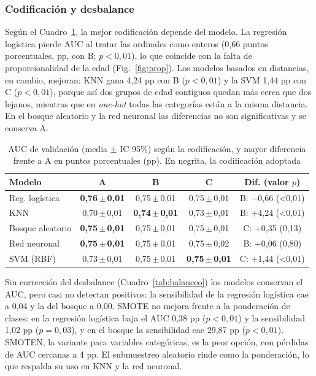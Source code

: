 \subsubsection{Codificación y desbalance}
Según el Cuadro~\ref{tab:codificacion}, la mejor codificación depende del modelo. La regresión logística pierde AUC al tratar las ordinales como enteros (0,66 puntos porcentuales, pp, con B; $p<0{,}01$), lo que coincide con la falta de proporcionalidad de la edad (Fig.~\ref{fig:prop}). Los modelos basados en distancias, en cambio, mejoran: KNN gana 4,24 pp con B ($p<0{,}01$) y la SVM 1,44 pp con C ($p<0{,}01$), porque así dos grupos de edad contiguos quedan más cerca que dos lejanos, mientras que en \textit{one-hot} todas las categorías están a la misma distancia. En el bosque aleatorio y la red neuronal las diferencias no son significativas y se conserva A.

\begin{table}[!t]
\centering
\caption{AUC de validación (media $\pm$ IC 95\%) según la codificación, y mayor diferencia frente a A en puntos porcentuales (pp). En negrita, la codificación adoptada}
\label{tab:codificacion}
\footnotesize
\setlength{\tabcolsep}{3pt}
\begin{tabular}{@{}lcccc@{}}
\toprule
\textbf{Modelo} & \textbf{A} & \textbf{B} & \textbf{C} & \textbf{Dif. (valor $p$)} \\
\midrule
Reg. logística & \textbf{0,76\,$\pm$\,0,01} & 0,75\,$\pm$\,0,01 & 0,75\,$\pm$\,0,01 & B: $-$0,66 (\textless 0,01) \\
KNN & 0,70\,$\pm$\,0,01 & \textbf{0,74\,$\pm$\,0,01} & 0,73\,$\pm$\,0,01 & B: +4,24 (\textless 0,01) \\
Bosque aleatorio & \textbf{0,75\,$\pm$\,0,01} & 0,75\,$\pm$\,0,01 & 0,75\,$\pm$\,0,01 & C: +0,35 (0,13) \\
Red neuronal & \textbf{0,75\,$\pm$\,0,01} & 0,75\,$\pm$\,0,01 & 0,75\,$\pm$\,0,02 & B: +0,06 (0,80) \\
SVM (RBF) & 0,73\,$\pm$\,0,01 & 0,75\,$\pm$\,0,01 & \textbf{0,75\,$\pm$\,0,01} & C: +1,44 (\textless 0,01) \\
\bottomrule
\end{tabular}
\end{table}

Sin corrección del desbalance (Cuadro~\ref{tab:balanceo}) los modelos conservan el AUC, pero casi no detectan positivos: la sensibilidad de la regresión logística cae a 0,04 y la del bosque a 0,00. SMOTE no mejora frente a la ponderación de clases: en la regresión logística baja el AUC 0,38 pp ($p<0{,}01$) y la sensibilidad 1,02 pp ($p=0{,}03$), y en el bosque la sensibilidad cae 29,87 pp ($p<0{,}01$). SMOTEN, la variante para variables categóricas, es la peor opción, con pérdidas de AUC cercanas a 4 pp. El submuestreo aleatorio rinde como la ponderación, lo que respalda su uso en KNN y la red neuronal.


